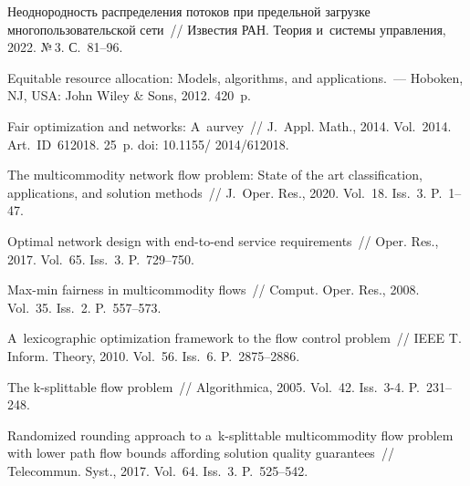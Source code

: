 \begin{multicols}{2}
{\small\frenchspacing
 {%
 \begin{thebibliography}{9}

 Неоднородность
распределения   потоков при предельной  загрузке
многопользовательской сети~//  Известия РАН. Теория и~сис\-те\-мы
управления,  2022. №\,3. С.~81--96.

 Equitable resource allocation: Models,
algorithms, and applications.~--- Hoboken, NJ, USA: John Wiley \& Sons, 2012.
420~p.

   Fair
optimization and networks: A~aurvey~// J.~Appl. Math., 2014. Vol.~2014. Art.~ID~612018. 25~p. doi: 10.1155/ 2014/612018.

 The multicommodity network
flow problem: State of the art classification, applications, and
solution methods~// J.~Oper. Res., 2020. Vol.~18. Iss.~3. P.~1--47.



  Optimal
network design with end-to-end service requirements~// Oper. Res.,
2017. Vol.~65. Iss.~3. P.~729--750.

 Max-min
fairness in multicommodity flows~// Comput. Oper. Res., 2008.
Vol.~35. Iss.~2. P.~557--573.

 A~lexicographic optimization
framework to the flow control problem~// IEEE T.
Inform. Theory, 2010. Vol.~56. Iss.~6. P.~2875--2886.

  The \mbox{k-splittable}
flow problem~//  Algorithmica, 2005. Vol.~42. Iss.~3-4.
P.~231--248.

 Randomized rounding approach to 
a~\mbox{k-splittable} multicommodity flow problem with lower path flow
bounds affording solution quality guarantees~// Telecommun. Syst.,
2017. Vol.~64. Iss.~3. P.~525--542.
\end{thebibliography}

 }
 }

\end{multicols}

\vspace*{-6pt}


